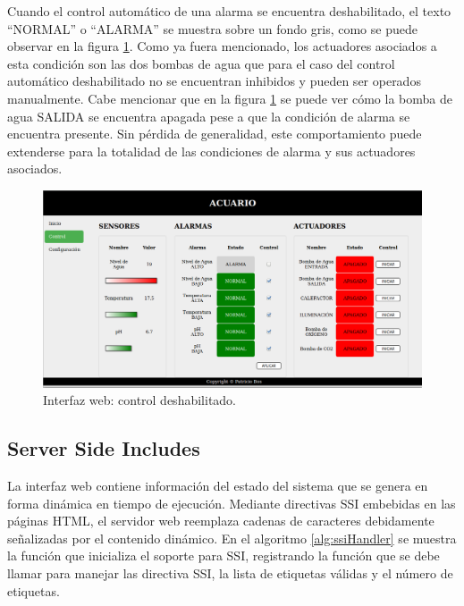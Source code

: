 \vspace{35px}

Cuando el control automático de una alarma se encuentra deshabilitado, el texto ``NORMAL'' o ``ALARMA'' se muestra sobre un fondo gris, como se puede observar en la figura \ref{fig:interfaz5}. Como ya fuera mencionado, los actuadores asociados a esta condición son las dos bombas de agua que para el caso del control automático deshabilitado no se encuentran inhibidos y pueden ser operados manualmente.  Cabe mencionar que en la figura \ref{fig:interfaz5} se puede ver cómo la bomba de agua SALIDA se encuentra apagada pese a que la condición de alarma se encuentra presente.  Sin pérdida de generalidad, este comportamiento puede extenderse para la totalidad de las condiciones de alarma y sus actuadores asociados.

\vspace{25px}

\begin{figure}[hp]
	\centering
    \includegraphics[width=1\textwidth]{./Figures/interfaz_control_alarma3}
	\caption{Interfaz web: control deshabilitado.}
	\label{fig:interfaz5}
\end{figure}

\clearpage

\subsection{Server Side Includes}
\label{sec:ssi}

La interfaz web contiene información del estado del sistema que se genera en forma dinámica en tiempo de ejecución. Mediante directivas SSI embebidas en las páginas HTML, el servidor web reemplaza cadenas de caracteres debidamente señalizadas por el contenido dinámico.  En el algoritmo \ref{alg:ssiHandler} se muestra la función que inicializa el soporte para SSI, registrando la función que se debe llamar para manejar las directiva SSI, la lista de etiquetas válidas y el número de etiquetas.

